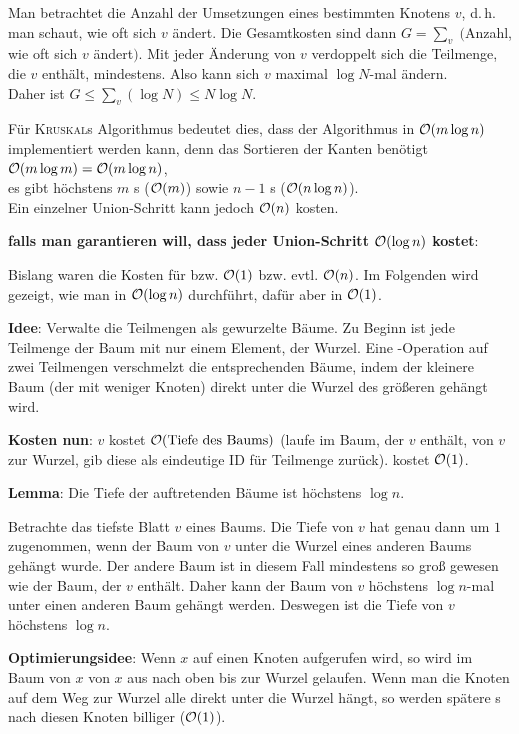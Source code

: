 \begin{Beweis}
    Man betrachtet die Anzahl der Umsetzungen eines bestimmten Knotens $v$,
    d.\,h. man schaut, wie oft sich \code{TM[}$v$\code{]} ändert.
    Die Gesamtkosten sind dann $G = \sum_v \;($Anzahl, wie oft sich
    \code{TM[}$v$\code{]} ändert$)$.
    Mit jeder Änderung von \code{TM[}$v$\code{]} verdoppelt sich die Teilmenge,
    die $v$ enthält, mindestens.
    Also kann sich \code{TM[}$v$\code{]} maximal $\log N$-mal ändern. \\
    Daher ist $G \le \sum_v (\log N) \le N \log N$.
\end{Beweis}

Für \textsc{Kruskal}s Algorithmus bedeutet dies,
dass der Algorithmus in $\mathcal{O}(m \log n)$ implementiert werden kann, denn
das Sortieren der Kanten benötigt $\mathcal{O}(m \log m) = \mathcal{O}(m \log n)$, \\
es gibt höchstens $m$ s ($\mathcal{O}(m)$) sowie
$n - 1$ s ($\mathcal{O}(n \log n)$). \\
Ein einzelner Union-Schritt kann jedoch $\mathcal{O}(n)$ kosten.

\linie

\textbf{falls man garantieren will, dass jeder Union-Schritt $\mathcal{O}(\log n)$
kostet}:

Bislang waren die Kosten für  bzw. 
$\mathcal{O}(1)$ bzw. evtl. $\mathcal{O}(n)$.
Im Folgenden wird gezeigt, wie man 
in $\mathcal{O}(\log n)$ durchführt, dafür aber  in $\mathcal{O}(1)$.

\textbf{Idee}: Verwalte die Teilmengen als gewurzelte Bäume.
Zu Beginn ist jede Teilmenge der Baum mit nur einem Element, der Wurzel.
Eine -Operation auf zwei Teilmengen verschmelzt die entsprechenden
Bäume, indem der kleinere Baum (der mit weniger Knoten) direkt unter die Wurzel
des größeren gehängt wird.

\textbf{Kosten nun}: $v$\code{)} kostet
$\mathcal{O}(\text{Tiefe des Baums})$ (laufe im Baum, der $v$ enthält, von $v$ zur
Wurzel, gib diese als eindeutige ID für Teilmenge zurück).
 kostet $\mathcal{O}(1)$.

\textbf{Lemma}:
Die Tiefe der auftretenden Bäume ist höchstens $\log n$.

\begin{Beweis}
    Betrachte das tiefste Blatt $v$ eines Baums.
    Die Tiefe von $v$ hat genau dann um $1$ zugenommen, wenn der Baum von $v$
    unter die Wurzel eines anderen Baums gehängt wurde.
    Der andere Baum ist in diesem Fall mindestens so groß gewesen wie der Baum,
    der $v$ enthält.
    Daher kann der Baum von $v$ höchstens $\log n$-mal unter einen anderen
    Baum gehängt werden.
    Deswegen ist die Tiefe von $v$ höchstens $\log n$.
\end{Beweis}

\textbf{Optimierungsidee}:
Wenn $x$\code{)} auf einen Knoten aufgerufen wird, so wird
im Baum von $x$ von $x$ aus nach oben bis zur Wurzel gelaufen.
Wenn man die Knoten auf dem Weg zur Wurzel alle direkt unter die Wurzel hängt,
so werden spätere s nach diesen Knoten billiger ($\mathcal{O}(1)$).

\pagebreak
